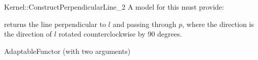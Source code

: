 \begin{ccRefFunctionObjectConcept}{Kernel::ConstructPerpendicularLine_2}
A model for this must provide:


        {returns the line perpendicular to $l$ and passing through $p$,
         where the direction is the direction of $l$ rotated 
         counterclockwise by 90 degrees.}

\ccRefines
AdaptableFunctor (with two arguments)

\ccSeeAlso
{} \\

\end{ccRefFunctionObjectConcept}
